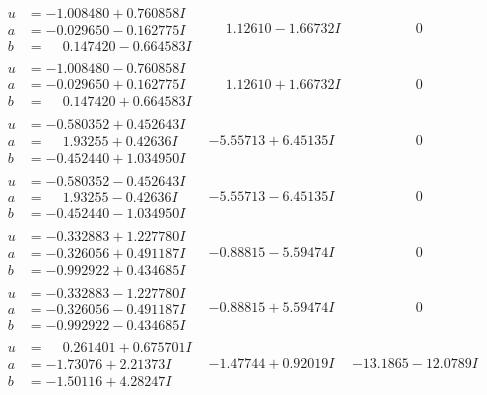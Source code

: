 \documentclass[1p]{elsarticle_modified}
\theoremstyle{definition}
\begin{document}
$$\begin{array}{c|c|c}
\begin{aligned}
u &= -1.008480 + 0.760858 I \\
a &= -0.029650 - 0.162775 I \\
b &= \phantom{-}0.147420 - 0.664583 I\end{aligned}
 & \phantom{-}1.12610 - 1.66732 I & \phantom{-0.000000 } 0 \\ \hline\begin{aligned}
u &= -1.008480 - 0.760858 I \\
a &= -0.029650 + 0.162775 I \\
b &= \phantom{-}0.147420 + 0.664583 I\end{aligned}
 & \phantom{-}1.12610 + 1.66732 I & \phantom{-0.000000 } 0 \\ \hline\begin{aligned}
u &= -0.580352 + 0.452643 I \\
a &= \phantom{-}1.93255 + 0.42636 I \\
b &= -0.452440 + 1.034950 I\end{aligned}
 & -5.55713 + 6.45135 I & \phantom{-0.000000 } 0 \\ \hline\begin{aligned}
u &= -0.580352 - 0.452643 I \\
a &= \phantom{-}1.93255 - 0.42636 I \\
b &= -0.452440 - 1.034950 I\end{aligned}
 & -5.55713 - 6.45135 I & \phantom{-0.000000 } 0 \\ \hline\begin{aligned}
u &= -0.332883 + 1.227780 I \\
a &= -0.326056 + 0.491187 I \\
b &= -0.992922 + 0.434685 I\end{aligned}
 & -0.88815 - 5.59474 I & \phantom{-0.000000 } 0 \\ \hline\begin{aligned}
u &= -0.332883 - 1.227780 I \\
a &= -0.326056 - 0.491187 I \\
b &= -0.992922 - 0.434685 I\end{aligned}
 & -0.88815 + 5.59474 I & \phantom{-0.000000 } 0 \\ \hline\begin{aligned}
u &= \phantom{-}0.261401 + 0.675701 I \\
a &= -1.73076 + 2.21373 I \\
b &= -1.50116 + 4.28247 I\end{aligned}
 & -1.47744 + 0.92019 I & -13.1865 - 12.0789 I \\ \hline\begin{aligned}

\end{aligned}
\end{array}$$
\end{document}
